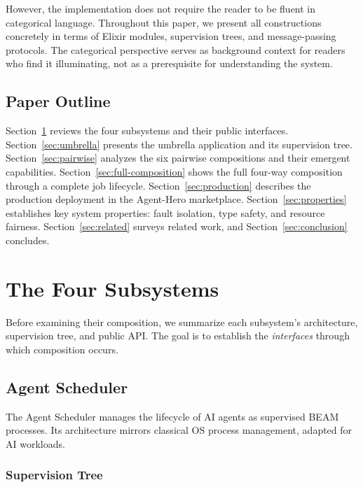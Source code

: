 \documentclass[12pt,a4paper]{article}
\theoremstyle{definition}
\begin{document}
However, the implementation does not require the reader to be fluent in categorical
language. Throughout this paper, we present all constructions concretely in terms of
Elixir modules, supervision trees, and message-passing protocols. The categorical
perspective serves as background context for readers who find it illuminating, not
as a prerequisite for understanding the system.

\subsection{Paper Outline}

Section~\ref{sec:subsystems} reviews the four subsystems and their public interfaces.
Section~\ref{sec:umbrella} presents the umbrella application and its supervision tree.
Section~\ref{sec:pairwise} analyzes the six pairwise compositions and their emergent
capabilities.  Section~\ref{sec:full-composition} shows the full four-way composition
through a complete job lifecycle.  Section~\ref{sec:production} describes the
production deployment in the Agent-Hero marketplace.  Section~\ref{sec:properties}
establishes key system properties: fault isolation, type safety, and resource fairness.
Section~\ref{sec:related} surveys related work, and Section~\ref{sec:conclusion}
concludes.


\section{The Four Subsystems}\label{sec:subsystems}

Before examining their composition, we summarize each subsystem's architecture,
supervision tree, and public API. The goal is to establish the \emph{interfaces}
through which composition occurs.

\subsection{Agent Scheduler}\label{subsec:scheduler}

The Agent Scheduler manages the lifecycle of AI agents as supervised BEAM processes.
Its architecture mirrors classical OS process management, adapted for AI workloads.

\subsubsection{Supervision Tree}
\end{document}
